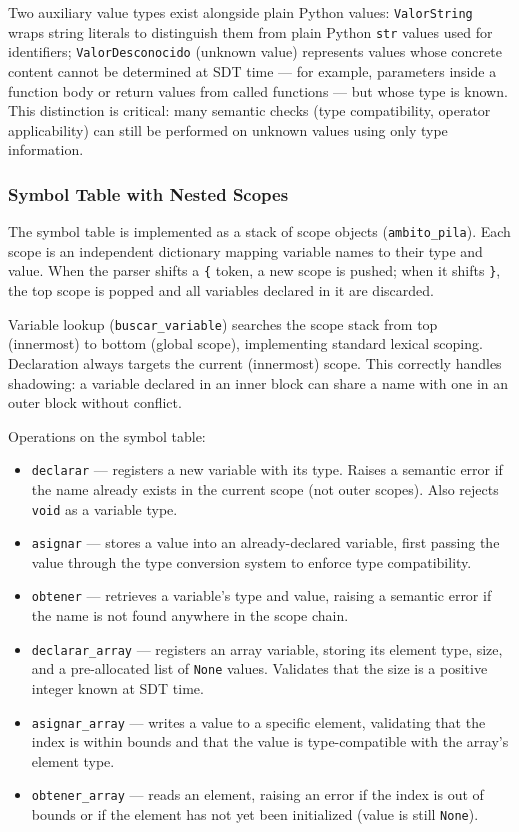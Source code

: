 \documentclass[letterpaper,12pt,oneside]{article}
\begin{document}
Two auxiliary value types exist alongside plain Python values: \texttt{ValorString} wraps string literals to distinguish them from plain Python \texttt{str} values used for identifiers; \texttt{ValorDesconocido} (unknown value) represents values whose concrete content cannot be determined at SDT time --- for example, parameters inside a function body or return values from called functions --- but whose type is known. This distinction is critical: many semantic checks (type compatibility, operator applicability) can still be performed on unknown values using only type information.

\subsubsection{Symbol Table with Nested Scopes}
The symbol table is implemented as a stack of scope objects (\texttt{ambito\_pila}). Each scope is an independent dictionary mapping variable names to their type and value. When the parser shifts a \texttt{\{} token, a new scope is pushed; when it shifts \texttt{\}}, the top scope is popped and all variables declared in it are discarded.

Variable lookup (\texttt{buscar\_variable}) searches the scope stack from top (innermost) to bottom (global scope), implementing standard lexical scoping. Declaration always targets the current (innermost) scope. This correctly handles shadowing: a variable declared in an inner block can share a name with one in an outer block without conflict.

Operations on the symbol table:
\begin{itemize}
    \item \texttt{declarar} --- registers a new variable with its type. Raises a semantic error if the name already exists in the current scope (not outer scopes). Also rejects \texttt{void} as a variable type.
    \item \texttt{asignar} --- stores a value into an already-declared variable, first passing the value through the type conversion system to enforce type compatibility.
    \item \texttt{obtener} --- retrieves a variable's type and value, raising a semantic error if the name is not found anywhere in the scope chain.
    \item \texttt{declarar\_array} --- registers an array variable, storing its element type, size, and a pre-allocated list of \texttt{None} values. Validates that the size is a positive integer known at SDT time.
    \item \texttt{asignar\_array} --- writes a value to a specific element, validating that the index is within bounds and that the value is type-compatible with the array's element type.
    \item \texttt{obtener\_array} --- reads an element, raising an error if the index is out of bounds or if the element has not yet been initialized (value is still \texttt{None}).
\end{itemize}
\end{document}
